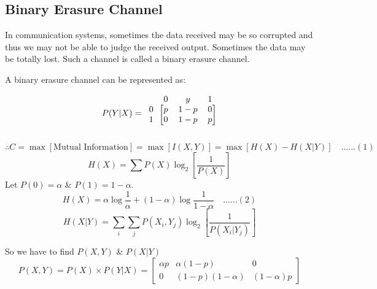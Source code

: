 \documentclass[12pt]{article}
\begin{document}
\subsection{Binary Erasure Channel}
In communication systems, sometimes the data received may be so corrupted and thus we may not be able to judge the received output. 
Sometimes the data may be totally lost. Such a channel is called a binary erasure channel. 

A binary erasure channel can be represented as: 

\begin{minipage}{.4\linewidth}
$$P(Y|X) = \begin{blockarray}{cccc}
 & 0 & y & 1\\
\begin{block}{c[ccc]}
0 & p & 1-p & 0 \\
1 & 0 & 1-p & p \\
\end{block}
\end{blockarray}$$
\end{minipage}%
\hfill
\begin{minipage}{.5\linewidth}
\centering
{}
\end{minipage}

$$\therefore C = \max[\text{Mutual Information}] = \max[I(X,Y)] = \max[H(X) - H(X|Y)] \quad \dots \dots (1)$$ 
$$H(X) = \sum P(X)\log_2\left[\frac{1}{P(X)}\right]$$ 
Let $P(0) = \alpha$ \& $P(1) = 1-\alpha$. 
$$H(X) = \alpha \log\frac{1}{\alpha} + (1-\alpha) \log\frac{1}{1-\alpha} \quad \dots \dots (2)$$ 
$$H(X|Y) = \sum_i \sum_j P(X_i, Y_j) \log_2\left[\frac{1}{P(X_i|Y_j)}\right]$$ 

So we have to find $P(X,Y)$ \& $P(X|Y)$ 
$$P(X,Y) = P(X) \times P(Y|X) = \begin{bmatrix}
\alpha p & \alpha(1-p) & 0 \\
0 & (1-p)(1-\alpha) & (1-\alpha)p
\end{bmatrix}$$ 
\end{document}
